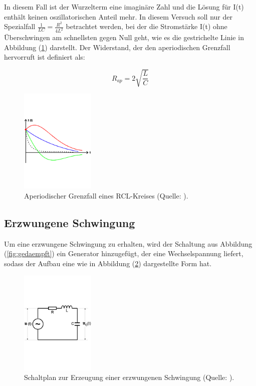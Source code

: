\begin{enumerate}
In diesem Fall ist der Wurzelterm eine imaginäre Zahl und die Lösung für I(t) enthält keinen oszillatorischen Anteil mehr.
In diesem Versuch soll nur der Spezialfall $\frac{1}{LC} = \frac{R^2}{4L^2}$ betrachtet werden, 
bei der die Stromstärke I(t) ohne Überschwingen am schnellsten gegen Null geht, 
wie es die gestrichelte Linie in Abbildung (\ref{fig:grenzfall}) darstellt.
Der Widerstand, der den aperiodischen Grenzfall hervorruft ist definiert als:

\begin{equation}
    R_{ap} = 2\sqrt{\frac{L}{C}}
\label{eqn:rap}
\end{equation}

\begin{figure}
    \centering
       \includegraphics[height=5cm]{grenzfall.pdf}
       \caption{Aperiodischer Grenzfall eines RCL-Kreises (Quelle: \cite{V354}).}
       \label{fig:grenzfall}
\end{figure}

\end{enumerate}

\newpage
\subsection{Erzwungene Schwingung}
Um eine erzwungene Schwingung zu erhalten, wird der Schaltung aus Abbildung (\ref{fig:gedaempft}) ein Generator hinzugefügt,
der eine Wechselspannung liefert, sodass der Aufbau eine wie in Abbildung (\ref{fig:erzwungen}) dargestellte Form hat.

\begin{figure}
    \centering
       \includegraphics[height=5cm]{erzwungen.pdf}
       \caption{Schaltplan zur Erzeugung einer erzwungenen Schwingung (Quelle: \cite{V354}).}
       \label{fig:erzwungen}
\end{figure}

